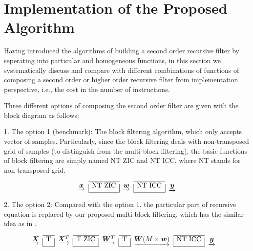\section{Implementation of the Proposed Algorithm}
\label{sec:implementation}

Having introduced the algorithms of building a second order recursive filter by seperating into 
particular and homogeneous functions,
in this section we systematically discuss and compare with 
different combinations of functions of composing a second order or higher order recursive filter from implementation 
perspective, i.e., the cost in the number of instructions. 

Three different options of composing the second order filter are given with the block diagram as follows:

1. The option 1 (benchmark): The block filtering algorithm, which only accepts vector of samples. Particularly, since the block filtering
deals with non-transposed grid of samples (to distinguish from the multi-block filtering), the basic functions of block filtering
are simply named NT ZIC and NT ICC, where NT stands for non-transposed grid.

\begin{equation*}
    \label{eq:option_1}
        \begin{array}{c|c|c|c|c}
            \cline{2-2}
            \cline{4-4}
            \underrightarrow{\bm{x}} & \text{NT ZIC} & \underrightarrow{\bm{w}} & \text{NT ICC} & \underrightarrow{\bm{y}} \\
            \cline{2-2}
            \cline{4-4}
    \end{array}
\end{equation*}

2. The option 2: Compared with the option 1, the particular part of recursive equation is replaced by our proposed multi-block filtering,
which has the similar idea as in \cite{Jaewoo_09}.

\begin{equation*}
    \label{eq:option_2}
    \begin{aligned}
        & \begin{array}{c|c|c|c|c|c|c|c|c}
            \cline{2-2}
            \cline{4-4}
            \cline{6-6}
            \cline{8-8}
            \underrightarrow{\bm{X}} & \text{T} & \underrightarrow{\bm{X}^T} & \text{T ZIC} & \underrightarrow{\bm{W}^T} & \text{T} & \underrightarrow{\bm{W} (M \times \bm{w})} & \text{NT ICC} & \underrightarrow{\bm{y}} \\
            \cline{2-2}
            \cline{4-4}
            \cline{6-6}
            \cline{8-8}
    \end{array}
\end{aligned}
\end{equation*}

